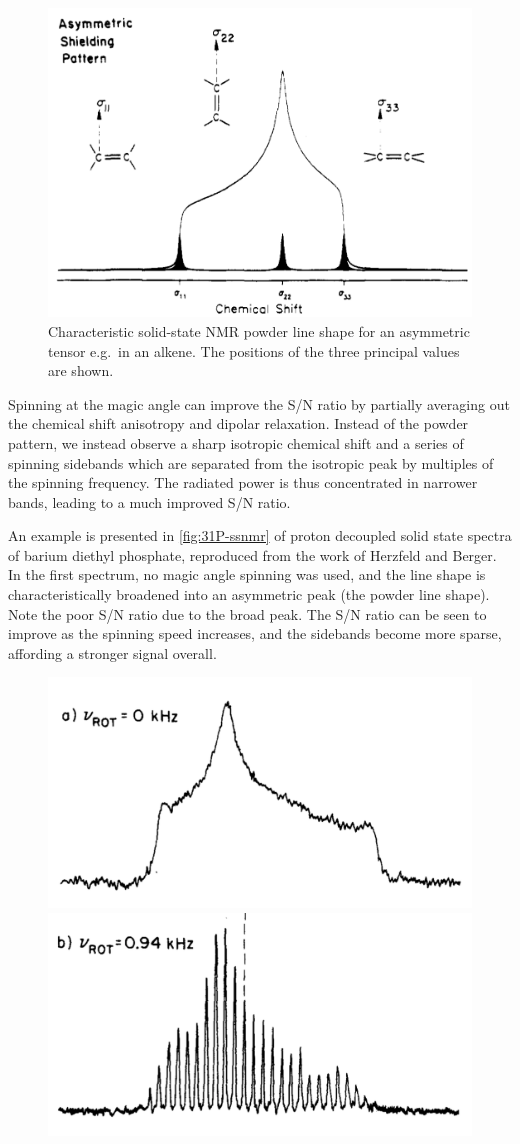 \begin{refsection}
\begin{figure}
  \centering
  \includegraphics[width=0.45\linewidth]{Figures/ssnmr-tensor.pdf}
  \caption[SS-NMR powder line shape.]{Characteristic solid-state NMR powder line shape for an asymmetric tensor e.g.\ in an alkene. The positions of the three principal values are shown.}\label{fig:ssnmr-tensor}
\end{figure}

Spinning at the magic angle can improve the S/N ratio by partially averaging out the chemical shift anisotropy and dipolar relaxation.
Instead of the powder pattern, we instead observe a sharp isotropic chemical shift and a series of spinning sidebands which are separated from the isotropic peak by multiples of the spinning frequency.
The radiated power is thus concentrated in narrower bands, leading to a much improved S/N ratio.

An example is presented in \cref{fig:31P-ssnmr} of proton decoupled solid state  spectra of barium diethyl phosphate, reproduced from the work of Herzfeld and Berger\autocite{Herzfeld1980SidebandAngle}.
In the first spectrum, no magic angle spinning was used, and the line shape is characteristically broadened into an asymmetric peak (the powder line shape).
Note the poor S/N ratio due to the broad peak.
The S/N ratio can be seen to improve as the spinning speed increases, and the sidebands become more sparse, affording a stronger signal overall.

\begin{figure}
    \centering
    \includegraphics[width=0.45\linewidth]{Figures/31P-ssnmr-0khz.pdf}
    \includegraphics[width=0.45\linewidth]{Figures/31P-ssnmr-0.94khz.pdf}


\end{figure}
\end{refsection}
